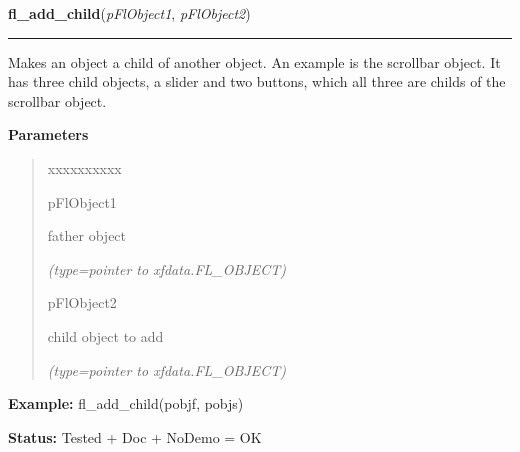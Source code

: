     \vspace{0.5ex}

\hspace{.8\funcindent}\begin{boxedminipage}{\funcwidth}

    \raggedright \textbf{fl\_add\_child}(\textit{pFlObject1}, \textit{pFlObject2})

    \vspace{-1.5ex}

    \rule{\textwidth}{0.5\fboxrule}
\setlength{\parskip}{2ex}
    Makes an object a child of another object. An example is the scrollbar 
    object. It has three child objects, a slider and two buttons, which all
    three are childs of the scrollbar object.

\setlength{\parskip}{1ex}
      \textbf{Parameters}
      \vspace{-1ex}

      \begin{quote}
        \begin{Ventry}{xxxxxxxxxx}

          \item[pFlObject1]

          father object

            {\it (type=pointer to xfdata.FL\_OBJECT)}

          \item[pFlObject2]

          child object to add

            {\it (type=pointer to xfdata.FL\_OBJECT)}

        \end{Ventry}

      \end{quote}

\textbf{Example:} fl\_add\_child(pobjf, pobjs)



\textbf{Status:} Tested + Doc + NoDemo = OK



    \end{boxedminipage}

    \label{xformslib:flbasic:fl_set_coordunit}

    \vspace{0.5ex}

